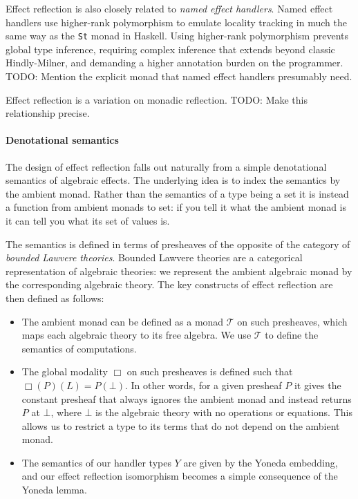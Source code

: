 \documentclass[acmsmall, screen, nonacm]{acmart}
\theoremstyle{definition}
\newcommand{\glob}{\mathop{\Box}}
\newcommand{\initial}{\bot}
\newcommand{\mon}{\mathcal{T}}
\newcommand{\todo}[1]{{\color{red}TODO: #1}}
\begin{document}
Effect reflection is also closely related to \emph{named effect
  handlers}\cite{??}. Named effect handlers use higher-rank polymorphism
to emulate locality tracking in much the same way as the
\lstinline[style=haskell]{St} monad in Haskell. Using higher-rank
polymorphism prevents global type inference, requiring complex inference
that extends beyond classic Hindly-Milner, and demanding a higher
annotation burden on the programmer. \todo{Mention the explicit monad
that named effect handlers presumably need.}

Effect reflection is a variation on monadic reflection\cite{??}.
\todo{Make this relationship precise.}

\paragraph{Denotational semantics} The design of effect reflection falls
out naturally from a simple denotational semantics of algebraic
effects. The underlying idea is to index the semantics by the ambient
monad. Rather than the semantics of a type being a set it is instead a
function from ambient monads to set: if you tell it what the ambient
monad is it can tell you what its set of values is.

The semantics is defined in terms of presheaves of the opposite of the
category of \emph{bounded Lawvere theories}. Bounded Lawvere theories
are a categorical representation of algebraic theories: we represent the
ambient algebraic monad by the corresponding algebraic theory. The key
constructs of effect reflection are then defined as follows:

\begin{itemize}
\item The ambient monad can be defined as a monad $\mon$ on such
  presheaves, which maps each algebraic theory to its free algebra. We use
  $\mon$ to define the semantics of computations.

\item The global modality $\glob$ on such presheaves is defined such
  that $\glob(P)(L) = P(\initial)$. In other words, for a given presheaf
  $P$ it gives the constant presheaf that always ignores the ambient
  monad and instead returns $P$ at $\initial$, where $\initial$ is the
  algebraic theory with no operations or equations. This allows us to
  restrict a type to its terms that do not depend on the ambient monad.

\item The semantics of our handler types $Y$ are given by the Yoneda
  embedding, and our effect reflection isomorphism becomes a simple
  consequence of the Yoneda lemma.
\end{itemize}
\end{document}
